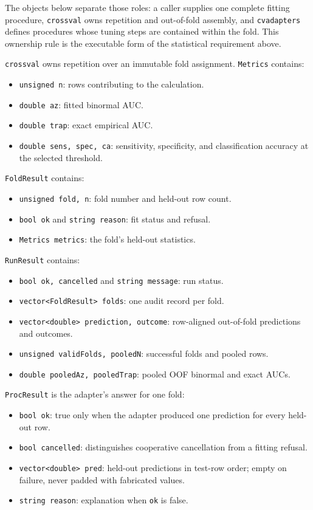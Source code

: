 The objects below separate those roles: a caller supplies one complete fitting
procedure, \texttt{crossval} owns repetition and out-of-fold assembly, and
\texttt{cvadapters} defines procedures whose tuning steps are contained within
the fold.  This ownership rule is the executable form of the statistical
requirement above.

\texttt{crossval} owns repetition over an immutable fold assignment.
\texttt{Metrics} contains:

\begin{itemize}
\item \texttt{unsigned n}: rows contributing to the calculation.
\item \texttt{double az}: fitted binormal AUC.
\item \texttt{double trap}: exact empirical AUC.
\item \texttt{double sens, spec, ca}: sensitivity, specificity, and
      classification accuracy at the selected threshold.
\end{itemize}

\texttt{FoldResult} contains:

\begin{itemize}
\item \texttt{unsigned fold, n}: fold number and held-out row count.
\item \texttt{bool ok} and \texttt{string reason}: fit status and refusal.
\item \texttt{Metrics metrics}: the fold's held-out statistics.
\end{itemize}

\texttt{RunResult} contains:

\begin{itemize}
\item \texttt{bool ok, cancelled} and \texttt{string message}: run status.
\item \texttt{vector<FoldResult> folds}: one audit record per fold.
\item \texttt{vector<double> prediction, outcome}: row-aligned out-of-fold
      predictions and outcomes.
\item \texttt{unsigned validFolds, pooledN}: successful folds and pooled rows.
\item \texttt{double pooledAz, pooledTrap}: pooled OOF binormal and exact AUCs.
\end{itemize}

\texttt{ProcResult} is the adapter's answer for one fold:

\begin{itemize}
\item \texttt{bool ok}: true only when the adapter produced one prediction for
      every held-out row.
\item \texttt{bool cancelled}: distinguishes cooperative cancellation from a
      fitting refusal.
\item \texttt{vector<double> pred}: held-out predictions in test-row order;
      empty on failure, never padded with fabricated values.
\item \texttt{string reason}: explanation when \texttt{ok} is false.
\end{itemize}

